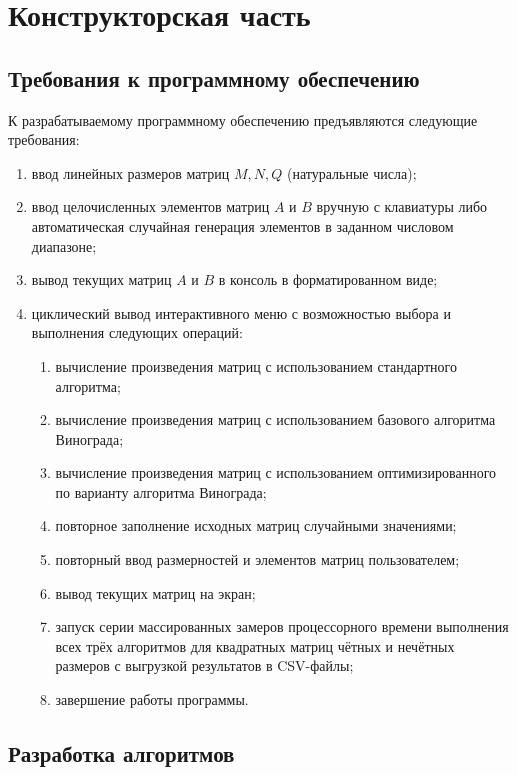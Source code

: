 \chapter{Конструкторская часть}

\section{Требования к программному обеспечению}

К разрабатываемому программному обеспечению предъявляются следующие требования:

\begin{enumerate}[label=\asbuk*)]
    \item ввод линейных размеров матриц $M, N, Q$ (натуральные числа);
    \item ввод целочисленных элементов матриц $A$ и $B$ вручную с клавиатуры либо автоматическая случайная генерация элементов в заданном числовом диапазоне;
    \item вывод текущих матриц $A$ и $B$ в консоль в форматированном виде;
    \item циклический вывод интерактивного меню с возможностью выбора и выполнения следующих операций:
    \begin{enumerate}[label=\arabic*)]
        \item вычисление произведения матриц с использованием стандартного алгоритма;
        \item вычисление произведения матриц с использованием базового алгоритма Винограда;
        \item вычисление произведения матриц с использованием оптимизированного по варианту алгоритма Винограда;
        \item повторное заполнение исходных матриц случайными значениями;
        \item повторный ввод размерностей и элементов матриц пользователем;
        \item вывод текущих матриц на экран;
        \item запуск серии массированных замеров процессорного времени выполнения всех трёх алгоритмов для квадратных матриц чётных и нечётных размеров с выгрузкой результатов в CSV-файлы;
        \item завершение работы программы.
    \end{enumerate}
\end{enumerate}

\section{Разработка алгоритмов}

